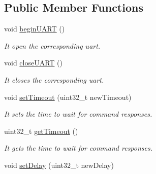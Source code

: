 \subsection*{Public Member Functions}
\begin{DoxyCompactItemize}
\item 
void \hyperlink{class_wasp_u_a_r_t_a23e43e8e7fe5f61d73e44cddd8d3f51d}{begin\+U\+A\+RT} ()\hypertarget{class_wasp_u_a_r_t_a23e43e8e7fe5f61d73e44cddd8d3f51d}{}\label{class_wasp_u_a_r_t_a23e43e8e7fe5f61d73e44cddd8d3f51d}

\begin{DoxyCompactList}\small\item\em It open the corresponding uart. \end{DoxyCompactList}\item 
void \hyperlink{class_wasp_u_a_r_t_aa8888b039b232e354a02c5b3f0f4a6b5}{close\+U\+A\+RT} ()\hypertarget{class_wasp_u_a_r_t_aa8888b039b232e354a02c5b3f0f4a6b5}{}\label{class_wasp_u_a_r_t_aa8888b039b232e354a02c5b3f0f4a6b5}

\begin{DoxyCompactList}\small\item\em It closes the corresponding uart. \end{DoxyCompactList}\item 
void \hyperlink{class_wasp_u_a_r_t_af7a968b2ba042149a3812805ff7eaf81}{set\+Timeout} (uint32\+\_\+t new\+Timeout)\hypertarget{class_wasp_u_a_r_t_af7a968b2ba042149a3812805ff7eaf81}{}\label{class_wasp_u_a_r_t_af7a968b2ba042149a3812805ff7eaf81}

\begin{DoxyCompactList}\small\item\em It sets the time to wait for command responses. \end{DoxyCompactList}\item 
uint32\+\_\+t \hyperlink{class_wasp_u_a_r_t_ab0a1835b2bdf12589003be0fea4c0e01}{get\+Timeout} ()\hypertarget{class_wasp_u_a_r_t_ab0a1835b2bdf12589003be0fea4c0e01}{}\label{class_wasp_u_a_r_t_ab0a1835b2bdf12589003be0fea4c0e01}

\begin{DoxyCompactList}\small\item\em It gets the time to wait for command responses. \end{DoxyCompactList}\item 
void \hyperlink{class_wasp_u_a_r_t_a44c3297ebc198dcbffd74c11877c57f9}{set\+Delay} (uint32\+\_\+t new\+Delay)\hypertarget{class_wasp_u_a_r_t_a44c3297ebc198dcbffd74c11877c57f9}{}\label{class_wasp_u_a_r_t_a44c3297ebc198dcbffd74c11877c57f9}


\end{DoxyCompactItemize}
